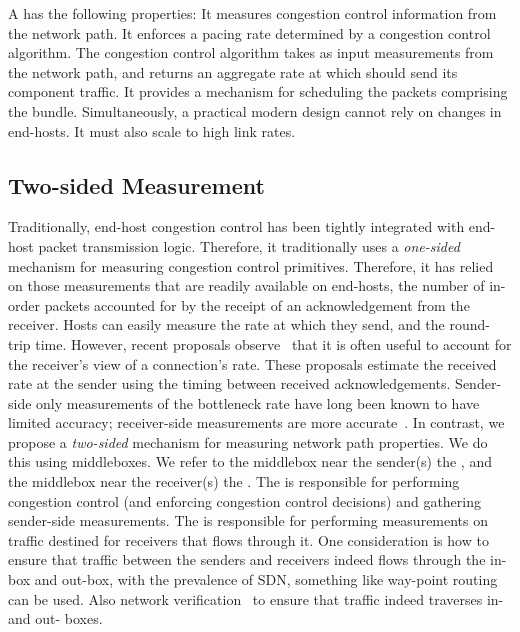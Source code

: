 \begin{outline}
\1 A \name has the following properties:
    \2 It measures congestion control information from the network path.
    \2 It enforces a pacing rate determined by a congestion control algorithm.
        \3 The congestion control algorithm takes as input measurements from the network path, and returns an aggregate rate at which \name should send its component traffic.
    \2 It provides a mechanism for scheduling the packets comprising the bundle.
\1 Simultaneously, a practical modern design cannot rely on changes in end-hosts.
\1 It must also scale to high link rates.
\end{outline}

\subsection{Two-sided Measurement}\label{s:design:twosided}
\begin{outline}
\1 Traditionally, end-host congestion control has been tightly integrated with end-host packet transmission logic.
    \1 Therefore, it traditionally uses a \emph{one-sided} mechanism for measuring congestion control primitives.
    \2 Therefore, it has relied on those measurements that are readily available on end-hosts, \ie the number of in-order packets accounted for by the receipt of an acknowledgement from the receiver.
    \2 Hosts can easily measure the rate at which they send, and the round-trip time.
    \2 However, recent proposals observe~\cite{bbr, sprout, remy, nimbus} that it is often useful to account for the receiver's view of a connection's rate.
        \3 These proposals estimate the received rate at the sender using the timing between received acknowledgements.
        \3 Sender-side only measurements of the bottleneck rate have long been known to have limited accuracy; receiver-side measurements are more accurate~\cite{packet-dynamics, path-properties}.
\1 In contrast, we propose a \emph{two-sided} mechanism for measuring network path properties.
    \2 We do this using middleboxes.
    \2 We refer to the middlebox near the sender(s) the \emph{\inbox}, and the middlebox near the receiver(s) the \emph{\outbox}.
    \2 The \inbox is responsible for performing congestion control (and enforcing congestion control decisions) and gathering sender-side measurements.
    \2 The \outbox is responsible for performing measurements on traffic destined for receivers that flows through it.
    \2 One consideration is how to ensure that traffic between the senders and receivers indeed flows through the in-box and out-box, with the prevalence of SDN, something like way-point routing~\cite{waypoint-routing} can be used. Also network verification~\cite{network-verification} to ensure that traffic indeed traverses in- and out- boxes.
\end{outline}

